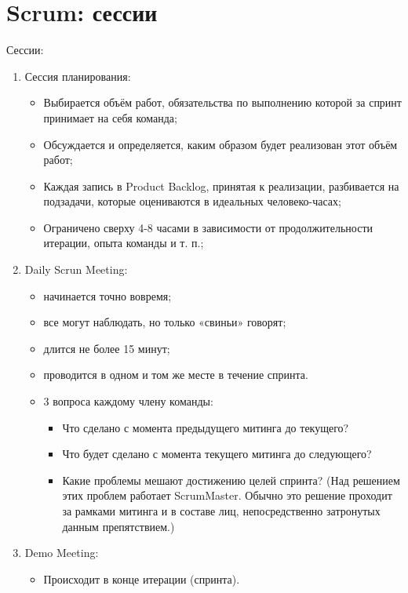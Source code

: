\documentclass{article}
\let\stdsection\section
\renewcommand\section{\newpage\stdsection}
\begin{document}
\section{Scrum: сессии}
    Сессии:
    \begin{enumerate}
        \item Сессия планирования:
        \begin{itemize}
            \item Выбирается объём работ, обязательства по выполнению которой за спринт принимает на себя команда;
            \item Обсуждается и определяется, каким образом будет реализован этот объём работ;
            \item Каждая запись в Product Backlog, принятая к реализации, разбивается на подзадачи, которые оцениваются в идеальных человеко-часах;
            \item Ограничено сверху 4-8 часами в зависимости от продолжительности итерации, опыта команды и т. п.;
        \end{itemize}
        \item Daily Scrun Meeting:
        \begin{itemize}
            \item начинается точно вовремя;
            \item все могут наблюдать, но только «свиньи» говорят;
            \item длится не более 15 минут;
            \item проводится в одном и том же месте в течение спринта.
            \item 3 вопроса  каждому члену команды:
            \begin{itemize}
                \item Что сделано с момента предыдущего митинга до текущего?
                \item Что будет сделано с момента текущего митинга до следующего?
                \item Какие проблемы мешают достижению целей спринта? (Над решением этих проблем работает ScrumMaster. Обычно это решение проходит за рамками митинга и в составе лиц, непосредственно затронутых данным препятствием.)
            \end{itemize}
        \end{itemize}
        \item Demo Meeting:
        \begin{itemize}
            \item Происходит в конце итерации (спринта).

\end{itemize}
\end{enumerate}
\end{document}
